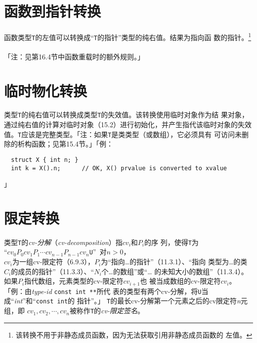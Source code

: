 \section{函数到指针转换}
\paragraph{}
函数类型\texttt{T}的左值可以转换成``\texttt{T}的指针''类型的纯右值。结果为指向函
数的指针。\footnote{该转换不用于非静态成员函数，因为无法获取引用非静态成员函数的
左值。}

\paragraph{}
「注：见第16.4节中函数重载时的额外规则。」

\section{临时物化转换}
\paragraph{}
类型\texttt{T}的纯右值可以转换成类型\texttt{T}的失效值。该转换使用临时对象作为结
果对象，通过纯右值的计算对临时对象（15.2）进行初始化，并产生指代该临时对象的失效
值。\texttt{T}应该是完整类型。「注：如果\texttt{T}是类类型（或数组），它必须具有
可访问未删除的析构函数；见第15.4节。」「例：
\begin{lstlisting}
  struct X { int n; }
  int k = X().n;      // OK, X() prvalue is converted to xvalue
\end{lstlisting}」

\section{限定转换}
\paragraph{}
类型\texttt{T}的\textit{cv-分解}（\textit{cv-decomposition}）指$cv_i$和$P_i$的序
列，使得\texttt{T}为                                                          \\
\mbox{\qquad\qquad “$cv_0P_0cv_1P_1\cdots cv_{n-1}P_{n-1}cv_n$\texttt{U}”
  对$n > 0$，}                                                                \\
$cv_i$为一组cv-限定符（6.9.3），$P_i$为“指向\ldots 的指针”（11.3.1）、“指向
类型为\ldots 的类$C_i$的成员的指针”（11.3.3）、“$N_i$个\ldots 的数组”或“\ldots
的未知大小的数组”（11.3.4）。如果$P_i$指代数组，元素类型的cv-限定符$cv_{i+1}$也
被当成数组的cv-限定符$cv_i$。「例：由\textit{type-id} \texttt{const int **}所代
表的类型有两个cv-分解，将\texttt{U}当成``\textit{int}''和``\texttt{const int}的
指针''。」 \texttt{T}的最长cv-分解第一个元素之后的cv限定符\textit{n}元组，即
$cv_1, cv_2, \cdots, cv_n$被称作\texttt{T}的\textit{cv-限定签名}。

